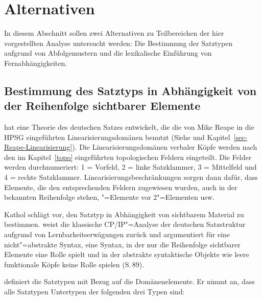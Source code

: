 \section{Alternativen}



In diesem Abschnitt sollen zwei Alternativen zu Teilbereichen der hier vorgestellten
Analyse untersucht werden: Die Bestimmung der Satztypen aufgrund von Abfolgemustern und die
lexikalische Einführung von Fernabhängigkeiten.

\subsection{Bestimmung des Satztyps in Abhängigkeit von der Reihenfolge sichtbarer Elemente}
\label{sec-satztypen-kathol}

\mbox{}\citet{Kathol95a,Kathol97a,Kathol2000a,Kathol2001a} hat eine Theorie des deutschen
Satzes entwickelt, die die von Mike Reape in die HPSG eingeführten Linearisierungsdomänen
benutzt (Siehe  und Kapitel~\ref{sec-Reape-Linearisierung}).
Die Linearisierungsdomänen verbaler Köpfe werden nach den im Kapitel~\ref{topo} eingeführten topologischen Feldern
eingeteilt. Die Felder werden durchnumeriert: 1 = Vorfeld, 2 = linke Satzklammer, 3 = Mittelfeld
und 4 = rechte Satzklammer. Linearisierungsbeschränkungen sorgen dann dafür, dass Elemente,
die den entsprechenden Feldern zugewiesen wurden, auch in der bekannten Reihenfolge stehen,
"=Elemente vor 2"=Elementen usw.

Kathol schlägt vor, den Satztyp in Abhängigkeit von sichtbarem Material zu bestimmen.
\citet{Kathol97a} weist die klassische CP/IP"=Analyse der deutschen Satzstruktur aufgrund von
Lernbarkeitserwägungen zurück und argumentiert für eine nicht"=abstrakte Syntax, \dash
eine Syntax, in der nur die Reihenfolge sichtbarer Elemente eine Rolle spielt und in der
abstrakte syntaktische Objekte wie \zb leere funktionale Köpfe keine Rolle spielen (S.\,89).


\citet{Kathol2001a} definiert die Satztypen mit Bezug auf die Domänenelemente.
Er nimmt an, dass alle Satztypen Untertypen der folgenden drei Typen sind:
\eal
\label{clause-types}
\ex\label{v1-clause-type}  \impl {}

